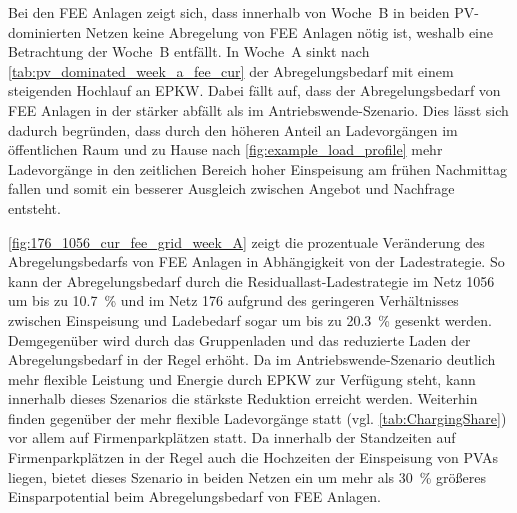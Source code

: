 


Bei den \gls{FEE} Anlagen zeigt sich, dass innerhalb von Woche~B in beiden \gls{PV}-dominierten Netzen keine Abregelung von \gls{FEE} Anlagen nötig ist, weshalb eine Betrachtung der Woche~B entfällt.
In Woche~A sinkt nach \autoref{tab:pv_dominated_week_a_fee_cur} der Abregelungsbedarf mit einem steigenden Hochlauf an \gls{EPKW}.
Dabei fällt auf, dass der Abregelungsbedarf von \gls{FEE} Anlagen in der \SzeFirmenparkplatz stärker abfällt als im Antriebswende-Szenario.
Dies lässt sich dadurch begründen, dass durch den höheren Anteil an Ladevorgängen im öffentlichen Raum und zu Hause nach \autoref{fig:example_load_profile} mehr Ladevorgänge in den zeitlichen Bereich hoher Einspeisung am frühen Nachmittag fallen und somit ein besserer Ausgleich zwischen Angebot und Nachfrage entsteht.



\autoref{fig:176_1056_cur_fee_grid_week_A} zeigt die prozentuale Veränderung des Abregelungsbedarfs von \gls{FEE} Anlagen in Abhängigkeit von der Ladestrategie.
So kann der Abregelungsbedarf durch die Residuallast-Ladestrategie im Netz \num{1056} um bis zu \SI{10.7}{\percent} und im Netz \num{176} aufgrund des geringeren Verhältnisses zwischen Einspeisung und Ladebedarf sogar um bis zu \SI{20.3}{\percent} gesenkt werden.
Demgegenüber wird durch das Gruppenladen und das reduzierte Laden der Abregelungsbedarf in der Regel erhöht.
Da im Antriebswende-Szenario deutlich mehr flexible Leistung und Energie durch \gls{EPKW} zur Verfügung steht, kann innerhalb dieses Szenarios die stärkste Reduktion erreicht werden.
Weiterhin finden gegenüber der \SzeFirmenparkplatz mehr flexible Ladevorgänge statt (vgl. \autoref{tab:ChargingShare}) vor allem auf Firmenparkplätzen statt.
Da innerhalb der Standzeiten auf Firmenparkplätzen in der Regel auch die Hochzeiten der Einspeisung von \glspl{PVA} liegen, bietet dieses Szenario in beiden Netzen ein um mehr als \SI{30}{\percent} größeres Einsparpotential beim Abregelungsbedarf von \gls{FEE} Anlagen.



